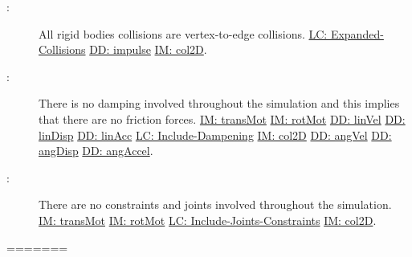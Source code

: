 \documentclass[12pt]{article}
\begin{document}
\begin{description}
\item[\atheassumpnum\label{A:collisionType}:]All rigid bodies collisions are vertex-to-edge collisions. \hyperref[lcEC]{LC: Expanded-Collisions} \hyperref[DD:impulse]{DD: impulse} \hyperref[IM:col2D]{IM: col2D}.
\end{description}
\begin{description}
\item[\atheassumpnum\label{A:dampingInvolvement}:]There is no damping involved throughout the simulation and this implies that there are no friction forces. \hyperref[IM:transMot]{IM: transMot} \hyperref[IM:rotMot]{IM: rotMot} \hyperref[DD:linVel]{DD: linVel} \hyperref[DD:linDisp]{DD: linDisp} \hyperref[DD:linAcc]{DD: linAcc} \hyperref[lcID]{LC: Include-Dampening} \hyperref[IM:col2D]{IM: col2D} \hyperref[DD:angVel]{DD: angVel} \hyperref[DD:angDisp]{DD: angDisp} \hyperref[DD:angAccel]{DD: angAccel}.
\end{description}
\begin{description}
\item[\atheassumpnum\label{A:constraintsAndJointsInvolvement}:]There are no constraints and joints involved throughout the simulation. \hyperref[IM:transMot]{IM: transMot} \hyperref[IM:rotMot]{IM: rotMot} \hyperref[lcIJC]{LC: Include-Joints-Constraints} \hyperref[IM:col2D]{IM: col2D}.
\end{description}
=======
\end{document}
